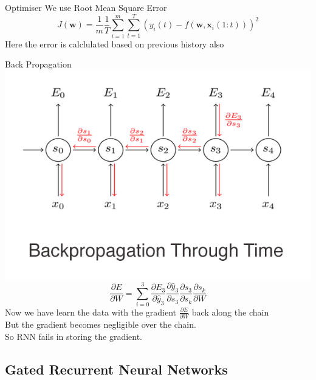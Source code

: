 \documentclass{beamer}
\theoremstyle{remark}
\let\vec\mathbf
\numberwithin{equation}{section}
\begin{document}
\begin{frame}{Optimiser}
We use Root Mean Square Error\\
\begin{equation*}
    {J(\vec{w})} = \frac{1}{m}\frac{1}{T}{\sum_{i=1}^{m}}{\sum_{t=1}^{T}}(y_i(t) -f(\vec{w},{\vec{x}_i}(1:t)))^2
\end{equation*}
Here the error is calclulated based on previous history also\\
\end{frame}
\begin{frame}{Back Propagation}\\
\includegraphics[width=0.5\columnwidth]{./figs/Back.png}\\
\begin{equation*}
    \frac{\partial E}{\partial {W}} = {\sum_{i=0}^{3}}\frac{\partial E_3}{\partial {\hat{y}_3}}\frac{\partial {\hat{y}_3}}{\partial {s_3}}\frac{\partial {s_3}}{\partial {s_k}}\frac{\partial {s_k}}{\partial {W}}
\end{equation*}
    Now we have learn the data with the gradient $\frac{\partial E}{\partial W}$ back along the chain\\
    But the gradient becomes negligible over the chain.\\
    So RNN fails in storing the gradient.
\end{frame}
\subsection{Gated Recurrent Neural Networks}
\end{document}
